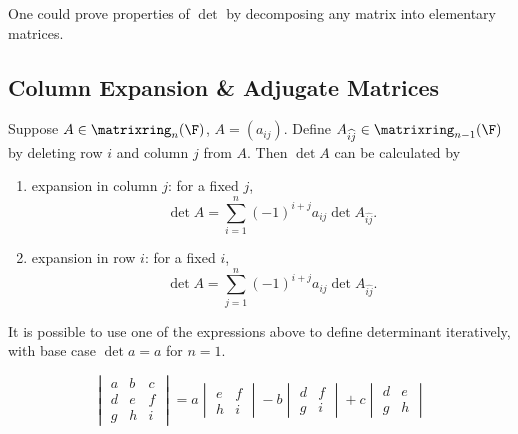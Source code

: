 \documentclass[a4paper]{article}
\newcommand*{\M}{\matrixring}
\theoremstyle{definition}
\begin{document}
One could prove properties of \(\det\) by decomposing any matrix into elementary matrices.

\subsection{Column Expansion \& Adjugate Matrices}

\begin{lemma}
  Suppose \(A \in \M_n(\F)\), \(A = (a_{ij})\). Define \(A_{\widehat{ij}} \in \M_{n - 1}(\F)\) by deleting row \(i\) and column \(j\) from \(A\). Then \(\det A\) can be calculated by
  \begin{enumerate}
  \item expansion in column \(j\): for a fixed \(j\),
    \[
      \det A = \sum_{i = 1}^{n} (-1)^{i + j} a_{ij} \det A_{\widehat{ij}}.
    \]
  \item expansion in row \(i\): for a fixed \(i\),
    \[
      \det A = \sum_{j = 1}^{n} (-1)^{i + j} a_{ij} \det A_{\widehat{ij}}.
    \]
  \end{enumerate}
\end{lemma}

\begin{remark}
  It is possible to use one of the expressions above to define determinant iteratively, with base case \(\det a = a\) for \(n = 1\).
\end{remark}

\begin{eg}
  \[
    \begin{vmatrix}
      a & b & c \\
      d & e & f \\
      g & h & i
    \end{vmatrix}
    =
    a
    \begin{vmatrix}
      e & f \\
      h & i
    \end{vmatrix}
    -b
    \begin{vmatrix}
      d & f \\
      g & i
    \end{vmatrix}
    +c
    \begin{vmatrix}
      d & e \\
      g & h
    \end{vmatrix}
  \]
\end{eg}
\end{document}
